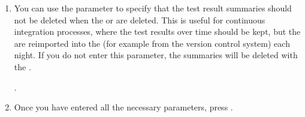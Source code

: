 \begin{enumerate}
\item You can use the parameter  to specify that the test result summaries should not be deleted when the \gdproject{} or \gdprojects{} are deleted. This is useful for continuous integration processes, where the test results over time should be kept, but the \gdprojects{} are reimported into the \gddb{} (for example from the version control system) each night. If you do not enter this parameter, the summaries will be deleted with the \gdprojects{}.

.
\item Once you have entered all the necessary parameters, press . 

\end{enumerate}
  
